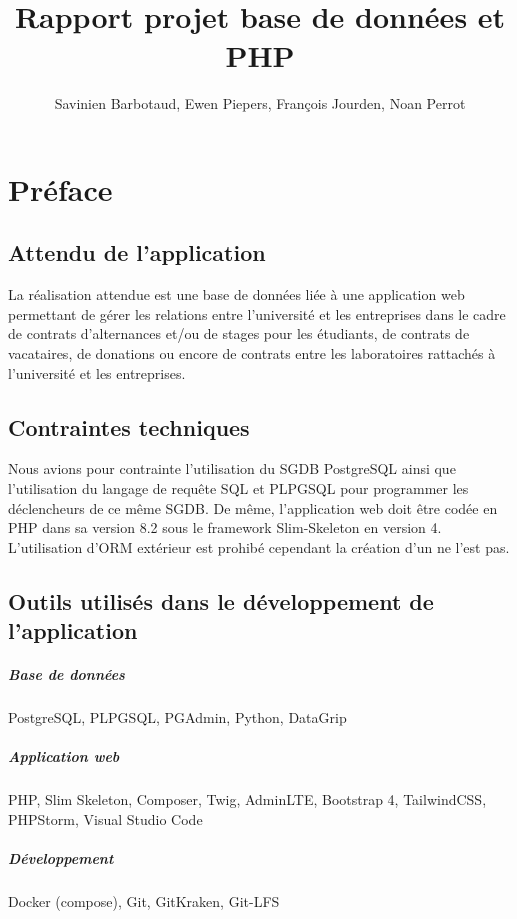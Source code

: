 \documentclass[french,12pt,a4paper,titlepage]{report}
\title{Rapport projet base de données et PHP}
\author{Savinien Barbotaud, Ewen Piepers, François Jourden, Noan Perrot}
\begin{document}
	\maketitle
	
	\newpage
	\thispagestyle{plain} %
	\mbox{}
    \addtocounter{page}{-1}
    \thispagestyle{empty}
    
	\tableofcontents
	\chapter{Préface}
	\section{Attendu de l'application}
	La réalisation attendue est une base de données liée à une application web permettant de gérer les relations entre l'université et les entreprises dans le cadre de contrats d'alternances et/ou de stages pour les étudiants, de contrats de vacataires, de donations ou encore de contrats entre les laboratoires rattachés à l'université et les entreprises.
	\section{Contraintes techniques}
	Nous avions pour contrainte l'utilisation du SGDB PostgreSQL ainsi que l'utilisation du langage de requête SQL et PLPGSQL pour programmer les déclencheurs de ce même SGDB.
	\newline
	De même, l'application web doit être codée en PHP dans sa version 8.2 sous le framework Slim-Skeleton en version 4. L'utilisation d'ORM extérieur est prohibé cependant la création d'un ne l'est pas.
	\section{Outils utilisés dans le développement de l'application}
	\paragraph{Base de données} PostgreSQL, PLPGSQL, PGAdmin, Python, DataGrip
	\paragraph{Application web} PHP, Slim Skeleton, Composer, Twig, AdminLTE, Bootstrap 4, TailwindCSS, PHPStorm, Visual Studio Code
	\paragraph{Développement} Docker (compose), Git, GitKraken, Git-LFS
\end{document}
